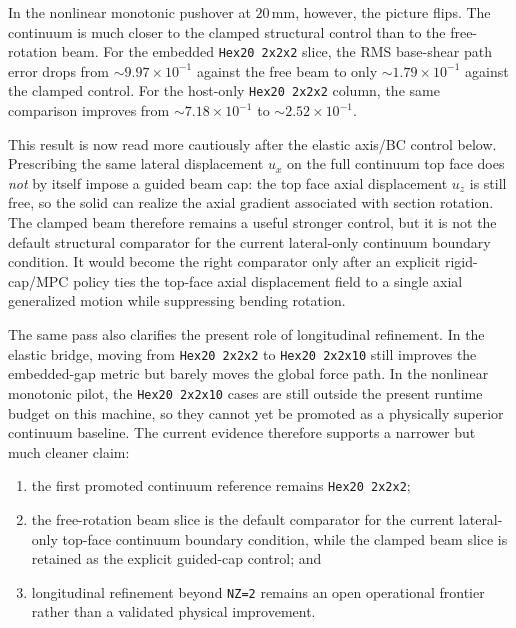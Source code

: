 In the nonlinear monotonic pushover at \(20\,\mathrm{mm}\), however, the
picture flips.  The continuum is much closer to the clamped structural control
than to the free-rotation beam.  For the embedded \texttt{Hex20 2x2x2} slice,
the RMS base-shear path error drops from \(\sim 9.97\times10^{-1}\) against
the free beam to only \(\sim 1.79\times10^{-1}\) against the clamped control.
For the host-only \texttt{Hex20 2x2x2} column, the same comparison improves
from \(\sim 7.18\times10^{-1}\) to \(\sim 2.52\times10^{-1}\).

This result is now read more cautiously after the elastic axis/BC control
below.  Prescribing the same lateral displacement \(u_x\) on the full
continuum top face does \emph{not} by itself impose a guided beam cap: the top
face axial displacement \(u_z\) is still free, so the solid can realize the
axial gradient associated with section rotation.  The clamped beam therefore
remains a useful stronger control, but it is not the default structural
comparator for the current lateral-only continuum boundary condition.  It
would become the right comparator only after an explicit rigid-cap/MPC policy
ties the top-face axial displacement field to a single axial generalized
motion while suppressing bending rotation.

The same pass also clarifies the present role of longitudinal refinement.  In
the elastic bridge, moving from \texttt{Hex20 2x2x2} to \texttt{Hex20 2x2x10}
still improves the embedded-gap metric but barely moves the global force path.
In the nonlinear monotonic pilot, the \texttt{Hex20 2x2x10} cases are still
outside the present runtime budget on this machine, so they cannot yet be
promoted as a physically superior continuum baseline.  The current evidence
therefore supports a narrower but much cleaner claim:
\begin{enumerate}
  \item the first promoted continuum reference remains \texttt{Hex20 2x2x2};
  \item the free-rotation beam slice is the default comparator for the current
    lateral-only top-face continuum boundary condition, while the clamped beam
    slice is retained as the explicit guided-cap control; and
  \item longitudinal refinement beyond \texttt{NZ=2} remains an open
    operational frontier rather than a validated physical improvement.
\end{enumerate}

